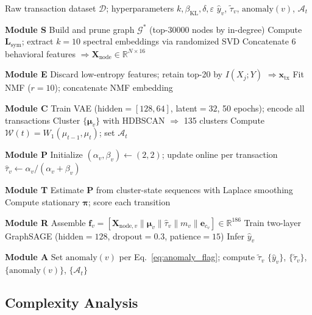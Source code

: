 \documentclass[journal]{IEEEtran}
\begin{document}
\begin{algorithm}[t]
\caption{\textsc{SPECTRA}}
\label{alg:spectra}
\begin{algorithmic}[1]
\Require Raw transaction dataset $\mathcal{D}$; hyperparameters $k, \beta_{\mathrm{KL}}, \delta, \varepsilon$
\Ensure  $\hat{y}_v$, $\tilde{\tau}_v$, $\mathrm{anomaly}(v)$, $\mathcal{A}_t$

\Statex \textbf{Module S}
\State Build and prune graph $\mathcal{G}^*$ (top-\num{30000} nodes by in-degree)
\State Compute $\mathbf{L}_{\mathrm{sym}}$; extract $k=10$ spectral embeddings via randomized SVD
\State Concatenate 6 behavioral features $\Rightarrow \mathbf{X}_{\mathrm{node}} \in \mathbb{R}^{N \times 16}$

\Statex \textbf{Module E}
\State Discard low-entropy features; retain top-20 by $I(X_j; Y)$ $\Rightarrow \mathbf{x}_{\mathrm{tx}}$
\State Fit NMF ($r=10$); concatenate NMF embedding

\Statex \textbf{Module C}
\State Train VAE (hidden$=[128,64]$, latent$=32$, 50 epochs); encode all transactions
\State Cluster $\{\boldsymbol{\mu}_v\}$ with HDBSCAN $\Rightarrow$ 135 clusters
    \State Compute $\mathcal{W}(t) = W_1(\mu_{t-1}, \mu_t)$; set $\mathcal{A}_t$
\EndFor

\Statex \textbf{Module P}
\State Initialize $(\alpha_v, \beta_v) \leftarrow (2, 2)$; update online per transaction
\State $\hat{\tau}_v \leftarrow \alpha_v / (\alpha_v + \beta_v)$

\Statex \textbf{Module T}
\State Estimate $\mathbf{P}$ from cluster-state sequences with Laplace smoothing
\State Compute stationary $\boldsymbol{\pi}$; score each transition

\Statex \textbf{Module R}
\State Assemble $\mathbf{f}_v = [\mathbf{X}_{\mathrm{node},v} \| \boldsymbol{\mu}_v \| \hat{\tau}_v \| m_v \| \mathbf{e}_{c_v}] \in \mathbb{R}^{186}$
\State Train two-layer GraphSAGE (hidden$=128$, dropout$=0.3$, patience$=15$)
\State Infer $\hat{y}_v$

\Statex \textbf{Module A}
    \State Set $\mathrm{anomaly}(v)$ per Eq.~\ref{eq:anomaly_flag}; compute $\tilde{\tau}_v$
\EndFor
\State \Return $\{\hat{y}_v\}$, $\{\tilde{\tau}_v\}$, $\{\mathrm{anomaly}(v)\}$, $\{\mathcal{A}_t\}$
\end{algorithmic}
\end{algorithm}

\subsection{Complexity Analysis}
\label{sec:complexity}
\end{document}
